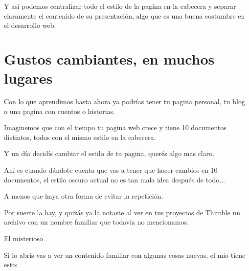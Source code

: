 \documentclass[letterpaper,10pt,spanish]{sphinxmanual}
\begin{document}
Y así podemos centralizar todo el estilo de la pagina en la cabecera y separar
claramente el contenido de su presentación, algo que es una buena costumbre en
el desarrollo web.

\begin{figure}[htbp]
\centering

\noindent{}
\end{figure}


\section{Gustos cambiantes, en muchos lugares}
\label{\detokenize{css-y-cosas-por-el-estilo:gustos-cambiantes-en-muchos-lugares}}
Con lo que aprendimos hasta ahora ya podrías tener tu pagina personal, tu blog
o una pagina con cuentos o historias.

Imaginemos que con el tiempo tu pagina web crece y tiene 10 documentos distintos,
todos con el mismo estilo en la cabecera.

Y un día decidís cambiar el estilo de tu pagina, querés algo mas claro.

Ahí es cuando dándote cuenta que vas a tener que hacer cambios en 10 documentos, el estilo oscuro actual no es tan mala idea después de todo...

A menos que haya otra forma de evitar la repetición.

Por suerte la hay, y quizás ya la notaste al ver en tus proyectos de Thimble un
archivo con un nombre familiar que todavía no mencionamos.

El misterioso .

Si lo abrís vas a ver un contenido familiar con algunas cosas nuevas, el mio tiene esto:
\end{document}
